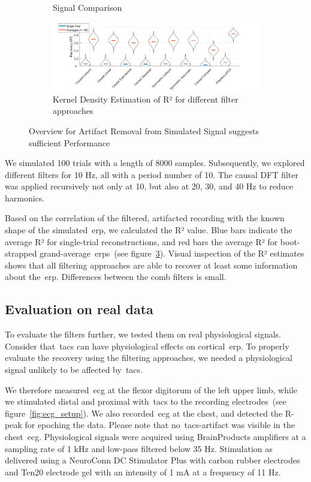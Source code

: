 \documentclass[a4paper]{article}
\newcommand{\figref}[1]{(see figure~\ref{#1})}
\begin{document}
\begin{figure}[hbtp]
\begin{subfigure}{0.75\textwidth}
\begin{subfigure}{.45\textwidth}
        \end{subfigure}
    \caption{Signal Comparison}\label{fig:simRaw}
    \end{subfigure}
    \begin{subfigure}{1.0\textwidth}
        \includegraphics[width=\textwidth]{img/eva/sim_R2.png}
        \caption{Kernel Density Estimation of R² for different filter approaches}\label{fig:simR2}
    \end{subfigure}
    \caption{Overview for Artifact Removal from  Simulated Signal suggests sufficient Performance}
\end{figure}

We simulated 100 trials with a length of 8000 samples. Subsequently, we explored different filters for 10 Hz, all with a period number of 10. The causal DFT filter was applied recursively not only at 10, but also at 20, 30, and 40 Hz to reduce harmonics.

Based on  the correlation of the filtered, artifacted recording with the known shape of the simulated~\gls{erp}, we calculated the R² value. Blue bars indicate the average R² for single-trial reconstructions, and red bars the average R² for boot-strapped grand-average~\gls{erp}s~\figref{fig:simR2}. Visual inspection of the R² estimates shows that all filtering approaches are able to recover at least some information about the~\gls{erp}. Differences between the comb filters is small.

\subsection{Evaluation on real data}\label{sec:EvaluationData}

To evaluate the filters further, we tested them on real physiological signals. Consider that~\gls{tacs} can have physiological effects on cortical~\gls{erp}. To properly evaluate the recovery using the filtering approaches, we needed a physiological signal unlikely to be affected by~\gls{tacs}.

We therefore measured~\gls{ecg} at the flexor digitorum of the left upper limb, while we stimulated distal and proximal with~\gls{tacs} to the recording electrodes~\figref{fig:ecg_setup}. We also recorded~\gls{ecg} at the chest, and detected the R-peak for epoching the data. Please note that no~\gls{tacs}-artifact was visible in the chest~\gls{ecg}.
Physiological signals were acquired using BrainProducts amplifiers at a sampling rate of 1 kHz and low-pass filtered below 35 Hz. Stimulation as delivered using a NeuroConn DC Stimulator Plus with carbon rubber electrodes and Ten20 electrode gel with an intensity of 1 mA at a frequency of 11 Hz.
\end{document}
